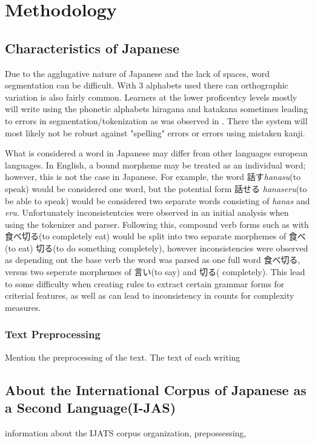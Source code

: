 \chapter{Methodology}
\section{Characteristics of Japanese}
Due to the agglugative nature of Japanese and the lack of spaces, word segmentation can be difficult. With 3
alphabets used there can orthographic variation is also fairly common. Learners at the lower proficentcy levels
mostly will write using the phonetic alphabets hiragana and katakana sometimes leading to errors in
segmentation/tokenization as was observed in \citep{yang1998, nagata2009}. There the system will
most likely not be robust against "spelling" errors or errors using mistaken kanji.

What is considered a word in Japanese may differ from other languages european languages. In
English, a bound morpheme may be treated
as an individual word; however, this is not the case in Japanese. For example, the word 話す\textit{hanasu}(to speak)
would be considered one word, but the potential form 話せる \textit{hanaseru}(to be able to speak) would be considered
two separate words consisting of \textit{hanas} and \textit{eru}. Unfortunately inconsistentcies were observed in an
initial analysis when using the tokenizer and parser. Following this, compound verb forms such as with 食べ切る(to
completely eat)
would be split into two separate morphemes of 食べ(to eat) 切る(to do something completely), however inconsistencies
were observed as depending ont the base verb the word was parsed as one full word 食べ切る, versus two seperate
morphemes of 言い(to
say) and 切る(
completely). This lead to some difficulty when creating rules to extract certain grammar forms for criterial
features, as well as can lead to inconsistency in counts for complexity measures.


\subsection{Text Preprocessing}
Mention the preprocessing of the text.
The text of each writing


\section{About the International Corpus of Japanese as a Second Language(I-JAS)}
information about the IJATS corpus organization, prepossessing,

